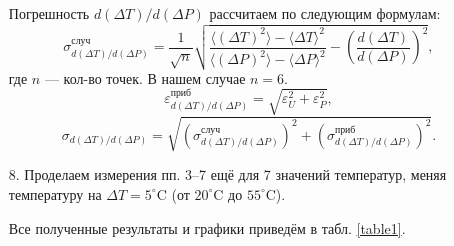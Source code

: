 \documentclass[a4paper, 12pt]{article}
\begin{document}
\begin{enumerate}
        Погрешность $d(\Delta T)/d(\Delta P)$ рассчитаем по следующим формулам:
        \begin{equation}
            \sigma_{d(\Delta T)/d(\Delta P)}^{случ} = \frac{1}{\sqrt{n}} \sqrt{\frac{\langle (\Delta T)^2 \rangle - \langle \Delta T \rangle^2}{\langle (\Delta P)^2 \rangle - \langle \Delta P \rangle^2} - \left( \frac{d(\Delta T)}{d(\Delta P)} \right)^2}, 
        \end{equation}
        где $n$ — кол-во точек. В нашем случае $n = 6$.
        \begin{equation}
            \varepsilon_{d(\Delta T)/d(\Delta P)}^{приб} = \sqrt{\varepsilon_U^2 + \varepsilon_P^2},
        \end{equation}
        \begin{equation}
            \sigma_{d(\Delta T)/d(\Delta P)} = \sqrt{(\sigma_{d(\Delta T)/d(\Delta P)}^{случ})^2 + (\sigma_{d(\Delta T)/d(\Delta P)}^{приб})^2}.
        \end{equation}
        
        \item[8.] Проделаем измерения пп. 3–7 ещё для 7 значений температур, меняя температуру на $\Delta T = 5^{\circ}\text{C}$ (от $20^{\circ}\text{C}$ до $55^{\circ}\text{C}$).
        
        Все полученные результаты и графики приведём в табл. \ref{table1}.
        
    \end{enumerate}
    
\end{document}
